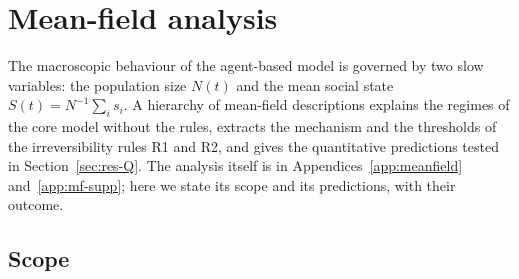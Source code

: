 
\section{Mean-field analysis}
\label{sec:meanfield}

The macroscopic behaviour of the agent-based model is governed by two slow variables: the population size $N(t)$
and the mean social state $S(t)=N^{-1}\sum_i s_i$. A hierarchy of mean-field descriptions explains the regimes of
the core model without the rules, extracts the mechanism and the thresholds of the irreversibility rules R1 and R2, and gives the
quantitative predictions tested in Section~\ref{sec:res-Q}. The analysis itself is in
Appendices~\ref{app:meanfield} and~\ref{app:mf-supp}; here we state its scope and its predictions, with their
outcome.

\subsection{Scope}
\label{sec:mf-scope}

